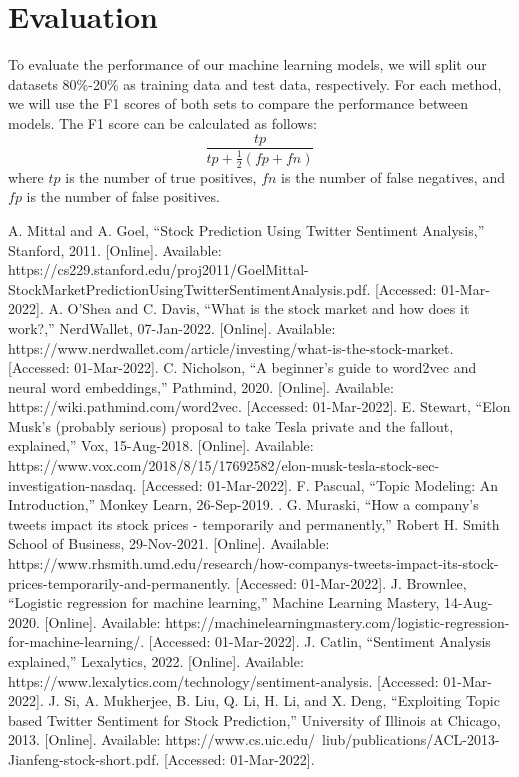 \documentclass[conference]{IEEEtran}
\begin{document}
\section*{Evaluation}
To evaluate the performance of our machine learning models, we will split our datasets 80\%-20\% as training data and test data, respectively. For each method, we will use the F1 scores of both sets to compare the performance between models. The F1 score can be calculated as follows:
\begin{equation*}
 \frac{tp}{tp+\frac{1}{2}(fp+fn)}
\end{equation*}
where $tp$ is the number of true positives, $fn$ is the number of false negatives, and $fp$ is the number of false positives.
\begin{thebibliography}{00}
     A. Mittal and A. Goel, “Stock Prediction Using Twitter Sentiment Analysis,” Stanford, 2011. [Online]. Available: https://cs229.stanford.edu/proj2011/GoelMittal-StockMarketPredictionUsingTwitterSentimentAnalysis.pdf. [Accessed: 01-Mar-2022].
     A. O'Shea and C. Davis, “What is the stock market and how does it work?,” NerdWallet, 07-Jan-2022. [Online]. Available: https://www.nerdwallet.com/article/investing/what-is-the-stock-market. [Accessed: 01-Mar-2022].
     C. Nicholson, “A beginner's guide to word2vec and neural word embeddings,” Pathmind, 2020. [Online]. Available: https://wiki.pathmind.com/word2vec. [Accessed: 01-Mar-2022].
     E. Stewart, “Elon Musk's (probably serious) proposal to take Tesla private and the fallout, explained,” Vox, 15-Aug-2018. [Online]. Available: https://www.vox.com/2018/8/15/17692582/elon-musk-tesla-stock-sec-investigation-nasdaq. [Accessed: 01-Mar-2022].
     F. Pascual, “Topic Modeling: An Introduction,” Monkey Learn, 26-Sep-2019. .
     G. Muraski, “How a company's tweets impact its stock prices - temporarily and permanently,” Robert H. Smith School of Business, 29-Nov-2021. [Online]. Available: https://www.rhsmith.umd.edu/research/how-companys-tweets-impact-its-stock-prices-temporarily-and-permanently. [Accessed: 01-Mar-2022].
     J. Brownlee, “Logistic regression for machine learning,” Machine Learning Mastery, 14-Aug-2020. [Online]. Available: https://machinelearningmastery.com/logistic-regression-for-machine-learning/. [Accessed: 01-Mar-2022].
     J. Catlin, “Sentiment Analysis explained,” Lexalytics, 2022. [Online]. Available: https://www.lexalytics.com/technology/sentiment-analysis. [Accessed: 01-Mar-2022].
     J. Si, A. Mukherjee, B. Liu, Q. Li, H. Li, and X. Deng, “Exploiting Topic based Twitter Sentiment for Stock Prediction,” University of Illinois at Chicago, 2013. [Online]. Available: https://www.cs.uic.edu/~liub/publications/ACL-2013-Jianfeng-stock-short.pdf. [Accessed: 01-Mar-2022].

\end{thebibliography}
\end{document}
